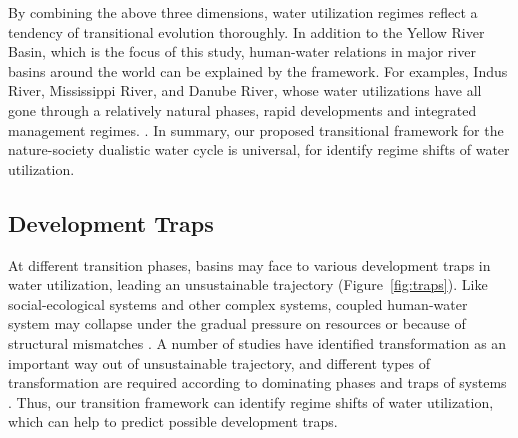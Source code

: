 \documentclass[9pt, twocolumn, twoside, lineno]{pnas-new}
\begin{document}
By combining the above three dimensions, water utilization regimes reflect a tendency of transitional evolution thoroughly. In addition to the Yellow River Basin, which is the focus of this study, human-water relations in major river basins around the world can be explained by the framework. For examples, Indus River, Mississippi River, and Danube River, whose water utilizations have all gone through a relatively natural phases, rapid developments and integrated management regimes. \cite{bestAnthropogenicStressesWorld2019,cummingResilienceBigRiver2011}. In summary, our proposed transitional framework for the nature-society dualistic water cycle is universal, for identify regime shifts of water utilization.

\subsection*{Development Traps}
At different transition phases, basins may face to various development traps in water utilization, leading an unsustainable trajectory (Figure~\ref{fig:traps}). 
Like social-ecological systems and other complex systems, coupled human-water system may collapse under the gradual pressure on resources or because of structural mismatches 
\cite{reyersSocialEcologicalSystemsInsights2018,cummingQuantifyingSocialEcologicalScale2020,wangCOSUSTMs0530Review}. 
A number of studies have identified transformation as an important way out of unsustainable trajectory, and different types of transformation are required according to dominating phases and traps of systems \cite{scoonesTransformationsSustainabilityCombining2020a,steffenTrajectoriesEarthSystem2018}. 
Thus, our transition framework can identify regime shifts of water utilization, which can help to predict possible development traps.
\end{document}
